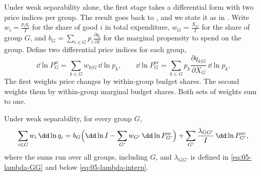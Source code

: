 Under weak separability alone, the first stage takes a differential form with two price indices per
group. The result goes back to \citet{BartenTurnovsky1966}, and we
state it as in \citet[\S 5.2, eqs.~2.20--2.23, pp.~132--133]{DeatonMuellbauer1980b}. Write $w_i =
\frac{p_iq_i}{I}$ for the share of good $i$ in total expenditure, $w_G = \frac{X_G}{I}$ for the share of
group $G$, and $b_G = \sum_{i \in G} p_i\frac{\partial q_i}{\partial I}$ for the marginal propensity to
spend on the group. Define two differential price indices for each group,
\begin{equation}\label{eq:05-two-indices}
  \dd\ln P^{w}_G = \sum_{k \in G} w_{k|G}\,\dd\ln p_k, \qquad
  \dd\ln P^{m}_G = \sum_{k \in G} p_k\frac{\partial q_{k|G}}{\partial X_G}\,\dd\ln p_k .
\end{equation}
The first weights price changes by within-group budget shares. The second weights them by within-group
marginal budget shares. Both sets of weights sum to one.

\begin{proposition}\label{prop:05-two-indices}
Under weak separability, for every group $G$,
\begin{equation}\label{eq:05-bt}
  \sum_{i \in G} w_i\,\dd\ln q_i
  = b_G\Bigl(\dd\ln I - \sum_{G'} w_{G'}\,\dd\ln P^{w}_{G'}\Bigr)
  + \sum_{G'} \frac{\lambda_{GG'}}{I}\,\dd\ln P^{m}_{G'} ,
\end{equation}
where the sums run over all groups, including $G$, and $\lambda_{GG'}$ is defined in
\eqref{eq:05-lambda-GG} and below \eqref{eq:05-lambda-interp}.
\end{proposition}


